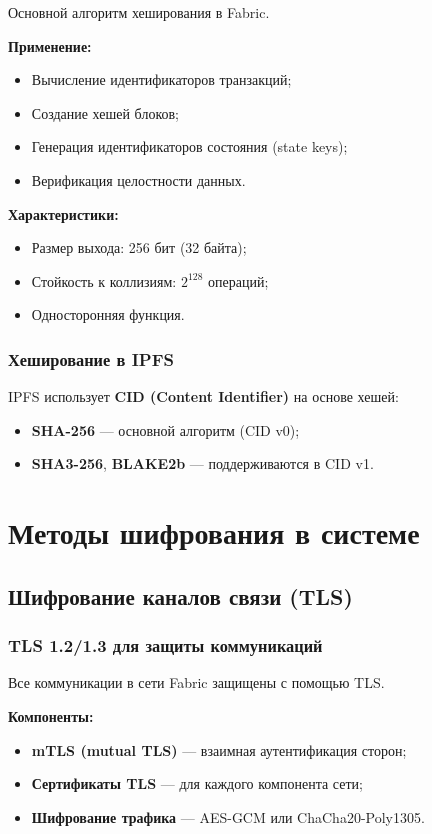 \documentclass[a4paper,14pt]{extreport}
\begin{document}
Основной алгоритм хеширования в Fabric.

\textbf{Применение:}
\begin{itemize}
    \item Вычисление идентификаторов транзакций;
    \item Создание хешей блоков;
    \item Генерация идентификаторов состояния (state keys);
    \item Верификация целостности данных.
\end{itemize}

\textbf{Характеристики:}
\begin{itemize}
    \item Размер выхода: 256 бит (32 байта);
    \item Стойкость к коллизиям: $2^{128}$ операций;
    \item Односторонняя функция.
\end{itemize}

\subsection{Хеширование в IPFS}

IPFS использует \textbf{CID (Content Identifier)} на основе хешей:
\begin{itemize}
    \item \textbf{SHA-256} --- основной алгоритм (CID v0);
    \item \textbf{SHA3-256}, \textbf{BLAKE2b} --- поддерживаются в CID v1.
\end{itemize}

\newpage

\chapter{Методы шифрования в системе}

\section{Шифрование каналов связи (TLS)}

\subsection{TLS 1.2/1.3 для защиты коммуникаций}

Все коммуникации в сети Fabric защищены с помощью TLS.

\textbf{Компоненты:}
\begin{itemize}
    \item \textbf{mTLS (mutual TLS)} --- взаимная аутентификация сторон;
    \item \textbf{Сертификаты TLS} --- для каждого компонента сети;
    \item \textbf{Шифрование трафика} --- AES-GCM или ChaCha20-Poly1305.
\end{itemize}
\end{document}

